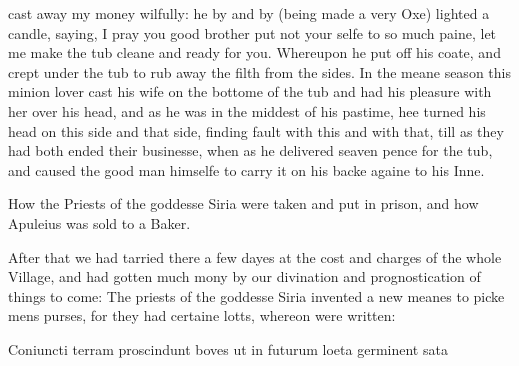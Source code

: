 cast away my money wilfully: he by and by (being made a very Oxe) lighted a
candle, saying, I pray you good brother put not your selfe to so much paine,
let me make the tub cleane and ready for you. Whereupon he put off his coate,
and crept under the tub to rub away the filth from the sides. In the meane
season this minion lover cast his wife on the bottome of the tub and had his
pleasure with her over his head, and as he was in the middest of his pastime,
hee turned his head on this side and that side, finding fault with this and
with that, till as they had both ended their businesse, when as he delivered
seaven pence for the tub, and caused the good man himselfe to carry it on his
backe againe to his Inne.


How the Priests of the goddesse Siria were taken and put in prison, and how
Apuleius was sold to a Baker.

After that we had tarried there a few dayes at the cost and charges of the
whole Village, and had gotten much mony by our divination and prognostication
of things to come: The priests of the goddesse Siria invented a new meanes to
picke mens purses, for they had certaine lotts, whereon were written:

Coniuncti terram proscindunt boves ut in futurum loeta germinent sata

